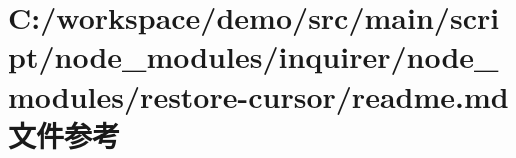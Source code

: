 \hypertarget{node__modules_2inquirer_2node__modules_2restore-cursor_2_r_e_a_d_m_e_8md}{}\section{C\+:/workspace/demo/src/main/script/node\+\_\+modules/inquirer/node\+\_\+modules/restore-\/cursor/readme.md 文件参考}
\label{node__modules_2inquirer_2node__modules_2restore-cursor_2_r_e_a_d_m_e_8md}
